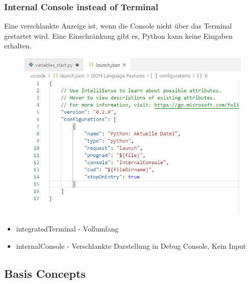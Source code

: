 \subsubsection{Internal Console instead of Terminal}
Eine verschlankte Anzeige ist, wenn die Console nicht über das Terminal gestartet wird. Eine Einschränkung gibt es, Python kann keine Eingaben erhalten.
\begin{figure}[H]
\centering
\includegraphics[scale = 0.2]{attachment/chapter_3/Scc070}
\end{figure}
\begin{itemize}
\item {} integratedTerminal - Vollumfang
\item {} internalConsole - Verschlankte Darstellung in Debug Console, Kein Input
\end{itemize}


\subsection{Basis Concepts}
